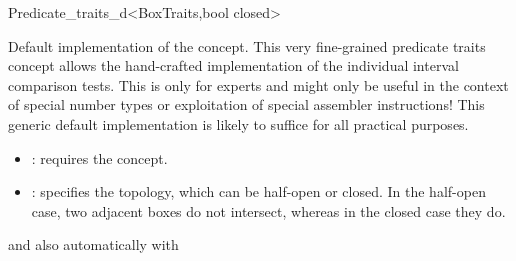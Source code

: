 
\begin{ccRefClass}{Predicate_traits_d<BoxTraits,bool closed>}
\begin{ccAdvanced}

\ccDefinition

Default implementation of the 
concept. This very fine-grained predicate traits concept allows the
hand-crafted implementation of the individual interval comparison
tests. This is only for experts and might only be useful in the
context of special number types or exploitation of special assembler
instructions!  This generic default implementation is likely to
suffice for all practical purposes.

\begin{itemize}
  \item
    : requires the  concept.
  \item
    : specifies the topology, which can be half-open
    or closed. In the half-open case, two adjacent boxes do not
    intersect, whereas in the closed case they do.
\end{itemize}

and also automatically with\\

\ccIsModel


\ccCreation
{}


\ccSeeAlso

\\


\end{ccAdvanced}
\end{ccRefClass}

